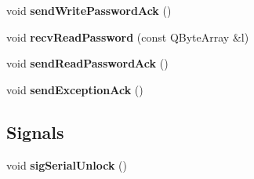 \begin{DoxyCompactItemize}
\item 
\mbox{\label{class_q_q_t_user_serial_protocol_a28c3c35cc307420802e694a8b2a67251}} 
void {\bfseries send\+Write\+Password\+Ack} ()
\item 
\mbox{\label{class_q_q_t_user_serial_protocol_ad569a636f0b2eddd8da96048fee91168}} 
void {\bfseries recv\+Read\+Password} (const Q\+Byte\+Array \&l)
\item 
\mbox{\label{class_q_q_t_user_serial_protocol_a821a63a296a36eb9fe7a26a13bfe93f8}} 
void {\bfseries send\+Read\+Password\+Ack} ()
\item 
\mbox{\label{class_q_q_t_user_serial_protocol_a8690e2b2b83392f1f046b5e887bdef29}} 
void {\bfseries send\+Exception\+Ack} ()
\end{DoxyCompactItemize}
\subsection*{Signals}
\begin{DoxyCompactItemize}
\item 
\mbox{\label{class_q_q_t_user_serial_protocol_afd8249fc7a4c896b701ec0e93a534b57}} 
void {\bfseries sig\+Serial\+Unlock} ()
\end{DoxyCompactItemize}
